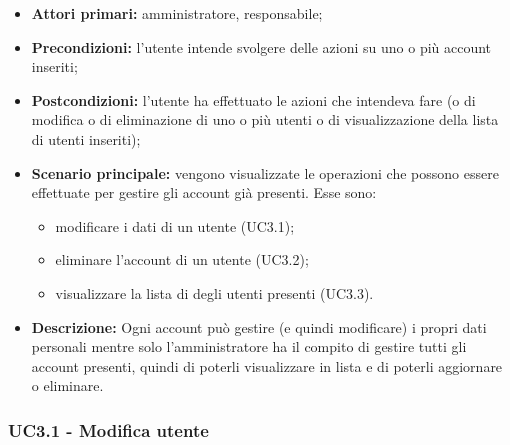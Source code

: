 \begin{itemize}
	\item 	\textbf{Attori primari:} amministratore, responsabile;
	\item 	\textbf{Precondizioni:} l'utente intende svolgere delle azioni su uno o più account inseriti;
	\item 	\textbf{Postcondizioni:} l'utente ha effettuato le azioni che intendeva fare (o di modifica o di eliminazione di uno o più utenti o di visualizzazione della lista di utenti inseriti);
	\item 	\textbf{Scenario principale:} vengono visualizzate le operazioni che possono essere effettuate per gestire gli account già presenti. Esse sono:
	\begin{itemize}
		\item modificare i dati di un utente (UC3.1);
		\item eliminare l'account di un utente (UC3.2);
		\item visualizzare la lista di degli utenti presenti (UC3.3).
	\end{itemize}
	\item 	\textbf{Descrizione:} Ogni account può gestire (e quindi modificare) i propri dati personali mentre solo l'amministratore ha il compito di gestire tutti gli account presenti, quindi di poterli visualizzare in lista e di poterli aggiornare o eliminare.
\end{itemize}

\subsubsection{UC3.1 - Modifica utente}

